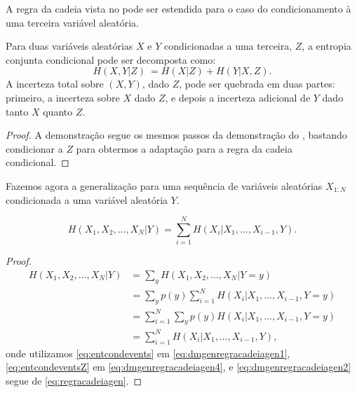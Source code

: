 A regra da cadeia vista no  pode ser estendida para o caso do condicionamento
à uma terceira variável aleatória.
\begin{proposition}\label{pro:regracadeiacond}
Para duas variáveis aleatórias  $X$ e $Y$ condicionadas a uma terceira, $Z$, 
a entropia conjunta condicional pode ser decomposta como:
\begin{equation}\label{eq:regracadeiacond}
    H(X,Y|Z) \: = H(X|Z) + H(Y|X,Z) .
\end{equation}
A incerteza total sobre $(X,Y)$, dado $Z$, pode ser quebrada em duas partes: 
primeiro, a incerteza sobre $X$ dado $Z$, e depois a incerteza adicional de $Y$ 
dado tanto $X$ quanto $Z$. 
\end{proposition}
\begin{proof}
A demonstração segue os mesmos passos da demonstração do , bastando
condicionar a $Z$ para obtermos a adaptação para a regra da cadeia condicional.
\end{proof}


Fazemos agora a generalização para uma sequência de variáveis aleatórias $X_{1:N}$ 
condicionada a uma variável aleatória $Y$.
\begin{proposition}\label{pro:regracadeiacondgen}
\begin{equation}\label{eq:regracadeiacondgen}
H(X_1, X_2, \ldots, X_N | Y) = \sum_{i=1}^{N} H(X_i|X_1, \ldots, X_{i-1}, Y) .
\end{equation}
\end{proposition}
\begin{proof}
\begin{subequations}\label{eq:dmgenregracadeiagen}
\begin{align}
    H(X_1, X_2, \ldots, X_N | Y) &= \sum_y H(X_1, X_2, \ldots, X_N | Y = y) \label{eq:dmgenregracadeiagen1}\\
				 &= \sum_y p(y) \sum_{i=1}^{N} H(X_i|X_1, \ldots, X_{i-1}, Y=y) \label{eq:dmgenregracadeiagen2}\\
				 &= \sum_{i=1}^{N} \sum_y p(y) H(X_i|X_1, \ldots, X_{i-1}, Y=y) \label{eq:dmgenregracadeiagen3}\\
				 &= \sum_{i=1}^{N} H(X_i|X_1, \ldots, X_{i-1}, Y) ,\label{eq:dmgenregracadeiagen4}
\end{align}
\end{subequations}
onde utilizamos \ref{eq:entcondevents} em \ref{eq:dmgenregracadeiagen1},
\ref{eq:entcondeventsZ} em \ref{eq:dmgenregracadeiagen4}, e
\ref{eq:dmgenregracadeiagen2} segue de \ref{eq:regracadeiagen}.
\end{proof}

